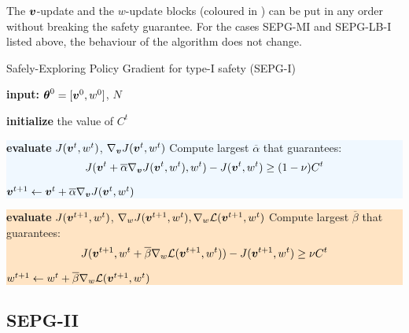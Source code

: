 \begin{note}
The $\boldsymbol{v}$-update and the $w$-update blocks (coloured in ) can be put in any order without breaking the safety guarantee. For the cases SEPG-MI and SEPG-LB-I listed above, the behaviour of the algorithm does not change. 
\end{note}
\begin{algorithm}[t]
\caption{Safely-Exploring Policy Gradient for type-I safety (SEPG-I)}
    \label{alg:sepg-I}
    \begin{algorithmic}[1] 
	\State \textbf{input:} ${\boldsymbol{\theta}}^0 = [\boldsymbol{v}^0, w^0]$, $N$

        	\State \textbf{initialize} the value of $C^t$ \label{alg:set-ct}
        	\newline
        	\hspace*{-\fboxsep}\colorbox{aliceblue}{\parbox{\linewidth}{
            \State \textbf{evaluate} $J(\boldsymbol{v}^t,w^t)$, $\nabla_{\boldsymbol{v}}{J(\boldsymbol{v}^t,w^t)}$ 
			\State Compute largest $\overline{\alpha}$ that guarantees: $$J(\boldsymbol{v}^t + \overline{\alpha} \nabla_{\boldsymbol{v}}J(\boldsymbol{v}^t, w^t), w^t) - J(\boldsymbol{v}^t, w^t) \geq (1-\nu)C^t$$

            \State $\boldsymbol{v}^{t+1} \gets \boldsymbol{v}^t + \overline{\alpha}\nabla_{\boldsymbol{v}}{J(\boldsymbol{v}^t, w^t)}$  }}

		\State\newline
		\hspace*{-\fboxsep}\colorbox{bisque}{\parbox{\linewidth}{
            
            \State \textbf{evaluate} $J(\boldsymbol{v}^{t+1}, w^t)$, $\nabla_{w}{J(\boldsymbol{v}^{t+1}, w^t)}, \nabla_{w}\mathcal{L}(\boldsymbol{v}^{t+1},w^t)$ 
            \State Compute largest $\overline{\beta}$ that guarantees:
            \State \[J(\boldsymbol{v}^{t+1}, w^t + \overline{\beta} \nabla_{w}\mathcal{L}(\boldsymbol{v}^{t+1}, w^t)) - J(\boldsymbol{v}^{t+1}, w^t) \geq \nu C^t\] 

            \State $w^{t+1} \gets w^t + \overline{ \beta}\nabla_{w}\mathcal{L}(\boldsymbol{v}^{t+1},w^t)$      }}       
        \EndFor
    \end{algorithmic}
\end{algorithm}


\subsection{SEPG-II}

